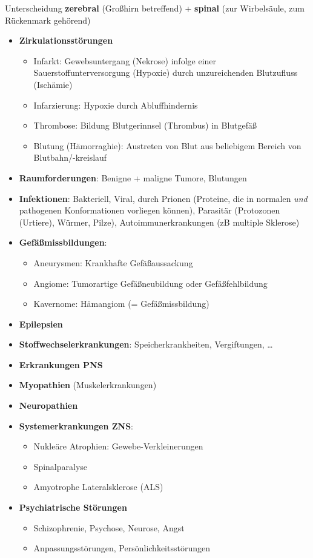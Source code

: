 Unterscheidung \textbf{zerebral} (Großhirn betreffend) + \textbf{spinal} (zur Wirbelsäule, zum Rückenmark gehörend)
\begin{itemize}
  \item \textbf{Zirkulationsstörungen}
  \begin{itemize}
    \item Infarkt: Gewebsuntergang (Nekrose) infolge einer Sauerstoffunterversorgung (Hypoxie) durch unzureichenden Blutzufluss (Ischämie)
    \item Infarzierung: Hypoxie durch Abluffhindernis
    \item Thrombose: Bildung Blutgerinnsel (Thrombus) in Blutgefäß
    \item Blutung (Hämorraghie): Austreten von Blut aus beliebigem Bereich von Blutbahn/-kreislauf
  \end{itemize}
  \item \textbf{Raumforderungen}: Benigne + maligne Tumore, Blutungen
  \item \textbf{Infektionen}: Bakteriell, Viral, durch Prionen (Proteine, die in normalen \emph{und} pathogenen Konformationen vorliegen können), Parasitär (Protozonen (Urtiere), Würmer, Pilze), Autoimmunerkrankungen (zB multiple Sklerose)
  \item \textbf{Gefäßmissbildungen}:
  \begin{itemize}
    \item Aneurysmen: Krankhafte Gefäßaussackung
    \item Angiome: Tumorartige Gefäßneubildung oder Gefäßfehlbildung
    \item Kavernome: Hämangiom (= Gefäßmissbildung)
  \end{itemize}
  \item \textbf{Epilepsien}
  \item \textbf{Stoffwechselerkrankungen}: Speicherkrankheiten, Vergiftungen, \dots
  \item \textbf{Erkrankungen PNS}
  \item \textbf{Myopathien} (Muskelerkrankungen)
  \item \textbf{Neuropathien}
  \item \textbf{Systemerkrankungen ZNS}:
  \begin{itemize}
    \item Nukleäre Atrophien: Gewebe-Verkleinerungen
    \item Spinalparalyse
    \item Amyotrophe Lateralsklerose (ALS)
  \end{itemize}
  \item \textbf{Psychiatrische Störungen}
  \begin{itemize}
    \item Schizophrenie, Psychose, Neurose, Angst
    \item Anpassungsstörungen, Persönlichkeitsstörungen
  \end{itemize}
\end{itemize}

